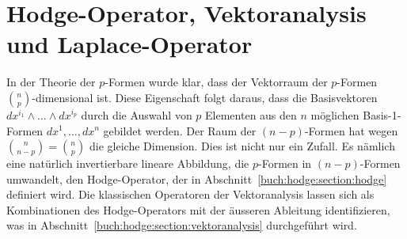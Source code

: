%
%
%
\chapter{Hodge-Operator, Vektoranalysis und Laplace-Operator
\label{chapter:hodge}}

\noindent
In der Theorie der $p$-Formen wurde klar, dass der Vektorraum der
$p$-Formen $\binom{n}{p}$-di\-men\-sio\-nal ist.
Diese Eigenschaft folgt daraus, dass die Basisvektoren
$dx^{i_1}\wedge\dots\wedge dx^{i_p}$ durch die Auswahl von $p$ Elementen
aus den $n$ möglichen Basis-1-Formen $dx^1,\dots,dx^n$ gebildet
werden.
Der Raum der $(n-p)$-Formen hat wegen $\binom{n}{n-p}=\binom{n}{p}$
die gleiche Dimension.
Dies ist nicht nur ein Zufall.
Es nämlich eine natürlich invertierbare lineare Abbildung, die $p$-Formen
in $(n-p)$-Formen umwandelt, den Hodge-Operator, der in
Abschnitt~\ref{buch:hodge:section:hodge} definiert wird.
Die klassischen Operatoren der Vektoranalysis lassen sich als
Kombinationen des Hodge-Operators mit der äusseren Ableitung identifizieren,
was in Abschnitt~\ref{buch:hodge:section:vektoranalysis} durchgeführt
wird.







\uebungsabschnitt

\begin{uebungsaufgaben}
\end{uebungsaufgaben}
\enduebungsabschnitt
